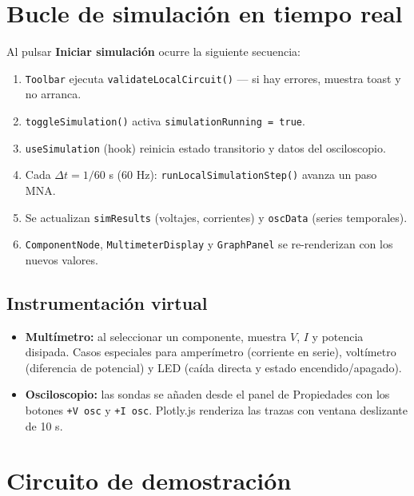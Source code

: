 \documentclass[12pt,a4paper]{article}
\begin{document}
\section{Bucle de simulación en tiempo real}

Al pulsar \textbf{Iniciar simulación} ocurre la siguiente secuencia:

\begin{enumerate}[label=\arabic*.]
  \item \texttt{Toolbar} ejecuta \texttt{validateLocalCircuit()} --- si hay errores, muestra toast y no arranca.
  \item \texttt{toggleSimulation()} activa \texttt{simulationRunning = true}.
  \item \texttt{useSimulation} (hook) reinicia estado transitorio y datos del osciloscopio.
  \item Cada $\Delta t = 1/60$ s (60 Hz): \texttt{runLocalSimulationStep()} avanza un paso MNA.
  \item Se actualizan \texttt{simResults} (voltajes, corrientes) y \texttt{oscData} (series temporales).
  \item \texttt{ComponentNode}, \texttt{MultimeterDisplay} y \texttt{GraphPanel} se re-renderizan con los nuevos valores.
\end{enumerate}

\subsection{Instrumentación virtual}

\begin{itemize}
  \item \textbf{Multímetro:} al seleccionar un componente, muestra $V$, $I$ y potencia disipada. Casos especiales para amperímetro (corriente en serie), voltímetro (diferencia de potencial) y LED (caída directa y estado encendido/apagado).
  \item \textbf{Osciloscopio:} las sondas se añaden desde el panel de Propiedades con los botones \texttt{+V osc} y \texttt{+I osc}. Plotly.js renderiza las trazas con ventana deslizante de 10 s.
\end{itemize}

\section{Circuito de demostración}
\end{document}
